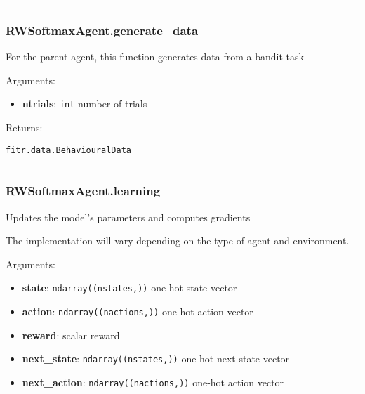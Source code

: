 \begin{center}\rule{0.5\linewidth}{\linethickness}\end{center}

\subsubsection{RWSoftmaxAgent.generate\_data}\label{rwsoftmaxagent.generate_data}

\begin{Shaded}
\begin{Highlighting}[]
\end{Highlighting}
\end{Shaded}

For the parent agent, this function generates data from a bandit task

Arguments:

\begin{itemize}
\tightlist
\item
  \textbf{ntrials}: \texttt{int} number of trials
\end{itemize}

Returns:

\texttt{fitr.data.BehaviouralData}

\begin{center}\rule{0.5\linewidth}{\linethickness}\end{center}

\subsubsection{RWSoftmaxAgent.learning}\label{rwsoftmaxagent.learning}

\begin{Shaded}
\begin{Highlighting}[]
\end{Highlighting}
\end{Shaded}

Updates the model's parameters and computes gradients

The implementation will vary depending on the type of agent and
environment.

Arguments:

\begin{itemize}
\tightlist
\item
  \textbf{state}: \texttt{ndarray((nstates,))} one-hot state vector
\item
  \textbf{action}: \texttt{ndarray((nactions,))} one-hot action vector
\item
  \textbf{reward}: scalar reward
\item
  \textbf{next\_state}: \texttt{ndarray((nstates,))} one-hot next-state
  vector
\item
  \textbf{next\_action}: \texttt{ndarray((nactions,))} one-hot action
  vector
\end{itemize}

